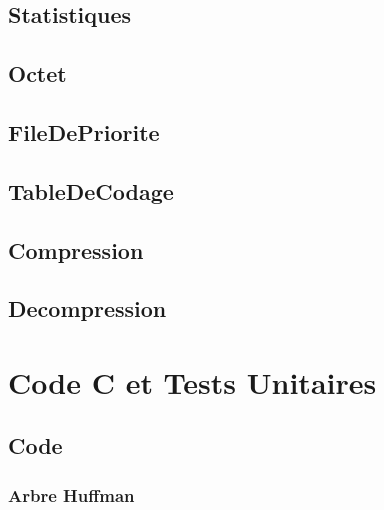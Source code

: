 \documentclass{article}
\begin{document}
\subsection{\textbf{Statistiques}}



\subsection{\textbf{Octet}}



\subsection{\textbf{FileDePriorite}}



\subsection{\textbf{TableDeCodage}}



\subsection{\textbf{Compression}}

%

\subsection{\textbf{Decompression}}

%

\newpage

\section{Code C et Tests Unitaires}

\subsection{Code}
\subsubsection{\textbf{Arbre Huffman}}

\end{document}
